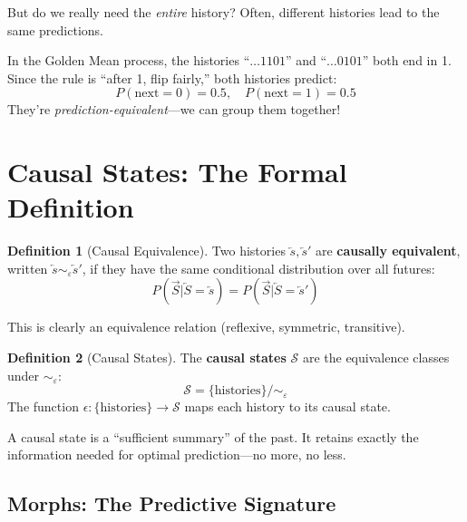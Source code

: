 \documentclass[11pt,a4paper]{article}
\theoremstyle{definition}
\newtheorem{definition}{Definition}[section]
\theoremstyle{plain}
\newcommand{\eps}{\varepsilon}
\newcommand{\calS}{\mathcal{S}}
\newcommand{\Past}{\overleftarrow{S}}
\newcommand{\Future}{\overrightarrow{S}}
\newcommand{\past}{\overleftarrow{s}}
\begin{document}
But do we really need the \emph{entire} history? Often, different histories lead to the same predictions.

\begin{example}[title=Golden Mean Process]
In the Golden Mean process, the histories ``$\ldots 1 1 0 1$'' and ``$\ldots 0 1 0 1$'' both end in 1. Since the rule is ``after 1, flip fairly,'' both histories predict:
\[
    P(\text{next} = 0) = 0.5, \quad P(\text{next} = 1) = 0.5
\]
They're \emph{prediction-equivalent}---we can group them together!
\end{example}

\section{Causal States: The Formal Definition}
\label{sec:causal-states}

\begin{definition}[Causal Equivalence]
\label{def:causal-equiv}
Two histories $\past, \past'$ are \textbf{causally equivalent}, written $\past \sim_\eps \past'$, if they have the same conditional distribution over all futures:
\begin{equation}
    P(\Future | \Past = \past) = P(\Future | \Past = \past')
\end{equation}
\end{definition}

This is clearly an equivalence relation (reflexive, symmetric, transitive).

\begin{definition}[Causal States]
\label{def:causal-state}
The \textbf{causal states} $\calS$ are the equivalence classes under $\sim_\eps$:
\begin{equation}
    \calS = \{\text{histories}\} / \sim_\eps
\end{equation}
The function $\epsilon: \{\text{histories}\} \to \calS$ maps each history to its causal state.
\end{definition}

\begin{intuition}
A causal state is a ``sufficient summary'' of the past. It retains exactly the information needed for optimal prediction---no more, no less.
\end{intuition}

\subsection{Morphs: The Predictive Signature}
\end{document}
